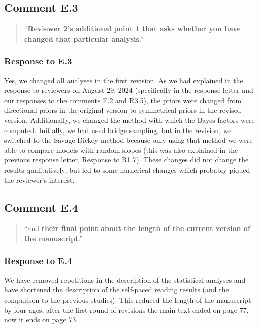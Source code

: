 \documentclass[12pt]{article}
\begin{document}
\begin{quote}
\end{quote}


\subsection*{Comment E.3}
\begin{quote}
``\textbf{Reviewer 2's additional point 1 that asks whether you have changed that particular analysis}.''
\end{quote}

\subsubsection*{Response to E.3}
Yes, we changed all analyses in the first revision. As we had explained in the response to reviewers on August 29, 2024 (specifically in the response letter and our responses to the comments E.2 and R3.5), the priors were changed from directional priors in the original version to symmetrical priors in the revised version. Additionally, we changed the method with which the Bayes factors were computed. Initially, we had used bridge sampling, but in the revision, we switched to the Savage-Dickey method because only using that method we were able to compare models with random slopes (this was also explained in the previous response letter, Response to R1.7). These changes did not change the results qualitatively, but led to some numerical changes which probably piqued the reviewer's interest.


\subsection*{Comment E.4}
\begin{quote}
``and \textbf{their final point about the length of the current version of the manuscript}.''
\end{quote}

\subsubsection*{Response to E.4}
We have removed repetitions in the description of the statistical analyses and have shortened the description of the self-paced reading results (and the comparison to the previous studies). This reduced the length of the manuscript by four ages; after the first round of revisions the main text ended on page 77, now it ends on page 73. 
\end{document}
